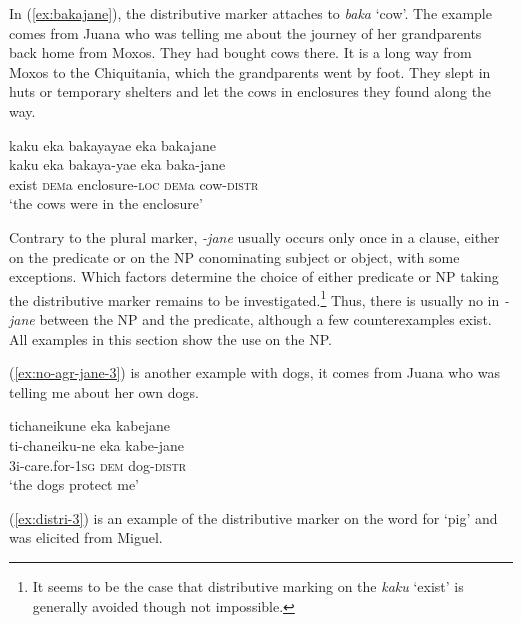 In (\ref{ex:bakajane}), the distributive marker attaches to \textit{baka} ‘cow’. The example comes from Juana who was telling me about the journey of her grandparents back home from Moxos. They had bought cows there. It is a long way from Moxos to the Chiquitania, which the grandparents went by foot. They slept in huts or temporary shelters and let the cows in enclosures they found along the way.

\ea\label{ex:bakajane}
\begingl 
\glpreamble kaku eka bakayayae eka bakajane\\
\gla kaku eka bakaya-yae eka baka-jane\\ 
\glb exist \textsc{dem}a enclosure-\textsc{loc} \textsc{dem}a cow-\textsc{distr}\\ 
\glft ‘the cows were in the enclosure’\\ 
\endgl
\trailingcitation{[jxx-p151016l-2.030]}
\xe

Contrary to the plural marker, \textit{-jane} usually occurs only once in a clause, either on the predicate or on the NP conominating subject or object, with some exceptions. Which factors determine the choice of either predicate or NP taking the distributive marker remains to be investigated.\footnote{It seems to be the case that distributive marking on the  \textit{kaku} ‘exist’ is generally avoided though not impossible.} Thus, there is usually no  in \textit{-jane} between the NP and the predicate, although a few counterexamples exist. All examples in this section show the use on the NP.


 (\ref{ex:no-agr-jane-3}) is another example with dogs, it comes from Juana who was telling me about her own dogs.

\ea\label{ex:no-agr-jane-3}
\begingl 
\glpreamble tichaneikune eka kabejane\\
\gla ti-chaneiku-ne eka kabe-jane\\ 
\glb 3i-care.for-1\textsc{sg} \textsc{dem} dog-\textsc{distr}\\ 
\glft ‘the dogs protect me’\\ 
\endgl
\trailingcitation{[jxx-e150925l-1.093]}
\xe

(\ref{ex:distri-3}) is an example of the distributive marker on the word for ‘pig’ and was elicited from Miguel.

